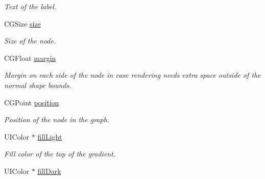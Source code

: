 \begin{Indent}
\begin{DoxyCompactItemize}
\begin{DoxyCompactList}\small\item\em Text of the label. \end{DoxyCompactList}\item 
\hypertarget{interface_p_c_graph_node_a956a5ef79e59483fc31e436afa9b8b0d}{
CGSize \hyperlink{interface_p_c_graph_node_a956a5ef79e59483fc31e436afa9b8b0d}{size}}
\label{interface_p_c_graph_node_a956a5ef79e59483fc31e436afa9b8b0d}

\begin{DoxyCompactList}\small\item\em Size of the node. \end{DoxyCompactList}\item 
\hypertarget{interface_p_c_graph_node_a774043cd22ebf70904f768cfa977111a}{
CGFloat \hyperlink{interface_p_c_graph_node_a774043cd22ebf70904f768cfa977111a}{margin}}
\label{interface_p_c_graph_node_a774043cd22ebf70904f768cfa977111a}

\begin{DoxyCompactList}\small\item\em Margin on each side of the node in case rendering needs extra space outside of the normal shape bounds. \end{DoxyCompactList}\item 
\hypertarget{interface_p_c_graph_node_a8010545fe3bb1a430b93c50d2854c5ce}{
CGPoint \hyperlink{interface_p_c_graph_node_a8010545fe3bb1a430b93c50d2854c5ce}{position}}
\label{interface_p_c_graph_node_a8010545fe3bb1a430b93c50d2854c5ce}

\begin{DoxyCompactList}\small\item\em Position of the node in the graph. \end{DoxyCompactList}\item 
\hypertarget{interface_p_c_graph_node_a7d597e17be54de67b712dfb4a86ca130}{
UIColor $\ast$ \hyperlink{interface_p_c_graph_node_a7d597e17be54de67b712dfb4a86ca130}{fillLight}}
\label{interface_p_c_graph_node_a7d597e17be54de67b712dfb4a86ca130}

\begin{DoxyCompactList}\small\item\em Fill color of the top of the gradient. \end{DoxyCompactList}\item 
\hypertarget{interface_p_c_graph_node_af106cfbfffc4e36054a5932e9f495dbb}{
UIColor $\ast$ \hyperlink{interface_p_c_graph_node_af106cfbfffc4e36054a5932e9f495dbb}{fillDark}}
\label{interface_p_c_graph_node_af106cfbfffc4e36054a5932e9f495dbb}


\end{DoxyCompactItemize}
\end{Indent}
